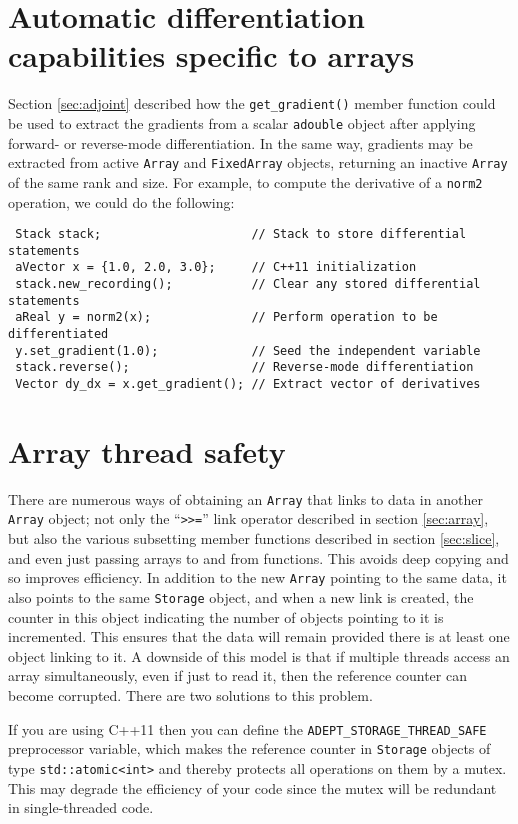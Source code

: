 \documentclass[a4,oneside]{book}
\def\codesize{\small}
\def\code#1{{\codesize\texttt{#1}}}
\def\cxx11{\marginpar{\rotatebox[origin=rb]{90}{\textbf{C++11 only~~~}}}}
\begin{document}
\section{Automatic differentiation capabilities specific to arrays}
Section \ref{sec:adjoint} described how the \code{get\_gradient()}
member function could be used to extract the gradients from a scalar
\code{adouble} object after applying forward- or reverse-mode
differentiation. In the same way, gradients may be extracted from
active \code{Array} and \code{FixedArray} objects, returning an
inactive \code{Array} of the same rank and size. For example, to
compute the derivative of a \code{norm2} operation, we could do the
following:
\begin{lstlisting}
 Stack stack;                     // Stack to store differential statements
 aVector x = {1.0, 2.0, 3.0};     // C++11 initialization
 stack.new_recording();           // Clear any stored differential statements
 aReal y = norm2(x);              // Perform operation to be differentiated
 y.set_gradient(1.0);             // Seed the independent variable
 stack.reverse();                 // Reverse-mode differentiation
 Vector dy_dx = x.get_gradient(); // Extract vector of derivatives
\end{lstlisting}

\section{Array thread safety}
\label{sec:thread}
There are numerous ways of obtaining an \code{Array} that links to
data in another \code{Array} object; not only the ``\code{>>=}'' link
operator described in section \ref{sec:array}, but also the various
subsetting member functions described in section \ref{sec:slice}, and
even just passing arrays to and from functions. This avoids deep
copying and so improves efficiency. In addition to the new \code{Array}
pointing to the same data, it also points to the same \code{Storage}
object, and when a new link is created, the counter in this object
indicating the number of objects pointing to it is incremented. This
ensures that the data will remain provided there is at least one
object linking to it.  A downside of this model is that if multiple
threads access an array simultaneously, even if just to read it, then
the reference counter can become corrupted.  There are two solutions
to this problem. 

\cxx11 \begin{leftbar} If you are using C++11 then you can define the
  \code{ADEPT\_STORAGE\_THREAD\_SAFE} preprocessor variable, which
  makes the reference counter in \code{Storage} objects of type
  \code{std::atomic<int>} and thereby protects all operations on them
  by a mutex. This may degrade the efficiency of your code since the
  mutex will be redundant in single-threaded code. \end{leftbar}
\end{document}
